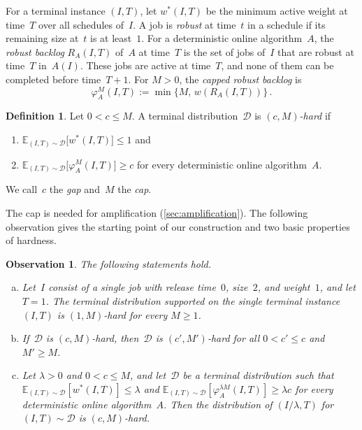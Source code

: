 \documentclass[11pt,letterpaper]{article}
\newtheorem{observation}[theorem]{Observation}
\theoremstyle{definition}
\newtheorem{definition}[theorem]{Definition}
\theoremstyle{remark}
\newcommand{\E}{\mathbb{E}}
\newcommand{\cD}{\mathcal{D}}
\begin{document}
For a terminal instance $(I,T)$, let $w^*(I,T)$ be the minimum active weight at time~$T$ over all schedules of~$I$. A job is \emph{robust} at time~$t$ in a schedule if its remaining size at~$t$ is at least~$1$. For a deterministic online algorithm~$A$, the \emph{robust backlog} $R_A(I,T)$ of~$A$ at time~$T$ is the set of jobs of~$I$ that are robust at time~$T$ in~$A(I)$. These jobs are active at time~$T$, and none of them can be completed before time~$T+1$. For $M>0$, the \emph{capped robust backlog} is
\begin{equation*}
  \varphi_A^M(I,T):=\min\bigl\{M,\,w(R_A(I,T))\bigr\}\,.
\end{equation*}

\begin{definition}\label{def:hard}
Let $0<c\le M$. A terminal distribution~$\cD$ is \emph{$(c,M)$-hard} if
\begin{enumerate}[label=(\roman*)]
	\item\label{def:hard-offline} $\E_{(I,T)\sim\cD}\bigl[w^*(I,T)\bigr]\le1$ and
	\item\label{def:hard-online} $\E_{(I,T)\sim\cD}\bigl[\varphi_A^M(I,T)\bigr]\ge c$ for every deterministic online algorithm~$A$.
\end{enumerate}
We call~$c$ the \emph{gap} and~$M$ the \emph{cap}.
\end{definition}

The cap is needed for amplification (\cref{sec:amplification}). The following observation gives the starting point of our construction and two basic properties of hardness.

\begin{observation}\label{obs:basic}
The following statements hold.
\begin{enumerate}[(a)]
\item\label{obs:base} Let~$I$ consist of a single job with release time~$0$, size~$2$, and weight~$1$, and let $T=1$. The terminal distribution supported on the single terminal instance $(I,T)$ is $(1,M)$-hard for every $M\ge1$.
\item\label{obs:monotone} If~$\cD$ is $(c,M)$-hard, then~$\cD$ is $(c',M')$-hard for all $0<c'\le c$ and $M'\ge M$.
\item\label{obs:scaling} Let $\lambda>0$ and $0<c\le M$, and let~$\cD$ be a terminal distribution such that $\E_{(I,T)\sim\cD}[w^*(I,T)]\le\lambda$ and $\E_{(I,T)\sim\cD}[\varphi_A^{\lambda M}(I,T)]\ge\lambda c$ for every deterministic online algorithm~$A$. Then the distribution of $(I/\lambda,T)$ for $(I,T)\sim\cD$ is $(c,M)$-hard.
\end{enumerate}
\end{observation}
\end{document}
